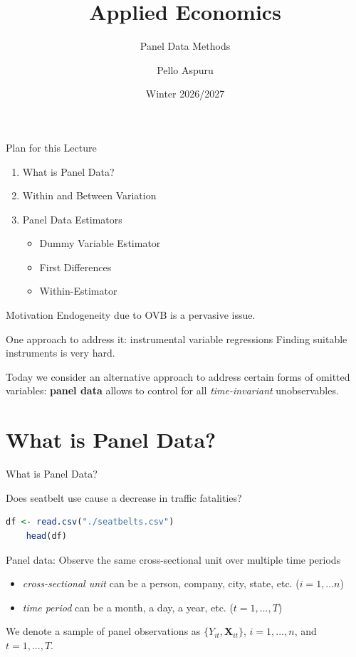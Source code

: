 \documentclass[9pt,aspectratio=169]{beamer}
\title{Applied Economics}
\subtitle{Panel Data Methods}
\author{Pello Aspuru}
\date{Winter 2026/2027}
\begin{document}
%
{
  \begin{frame}
    \titlepage
  \end{frame}
}

\begin{frame}{Plan for this Lecture}
\begin{enumerate}

\item What is Panel Data?

\item  Within and Between Variation

\item Panel Data Estimators
\begin{itemize}
\item Dummy Variable Estimator
\item First Differences
\item Within-Estimator 
\end{itemize}
\end{enumerate}
\end{frame}

\begin{frame}{Motivation}
Endogeneity due to OVB is a pervasive issue.

One approach to address it: instrumental variable regressions
\pause
Finding suitable instruments is very hard.

Today we consider an alternative approach to address certain forms of omitted variables: 
\textbf{panel data} allows to control for all \textit{time-invariant} unobservables.

\end{frame}

\section{What is Panel Data?}

\begin{frame}[fragile]{What is Panel Data?}

\begin{center}
    Does seatbelt use \alert{cause} a decrease in traffic fatalities?
\end{center}   
\begin{lstlisting}[language=R]
    df <- read.csv("./seatbelts.csv")
    head(df)
\end{lstlisting}
\pause
Panel data: Observe the same cross-sectional unit over multiple time periods 
\begin{itemize}
    \item \textit{cross-sectional unit} can be a person, company, city, \alert{state}, etc. ($i = 1,…n$) 
    \item \textit{time period} can be a month, a day, \alert{a year}, etc. ($t = 1,…,T$)
\end{itemize}

We denote a sample of panel observations as  $\{Y_{it}, \boldsymbol{X}_{it}\}$,  $i = 1, ... , n$, and $t = 1, ..., T$.
\end{frame}
\end{document}
